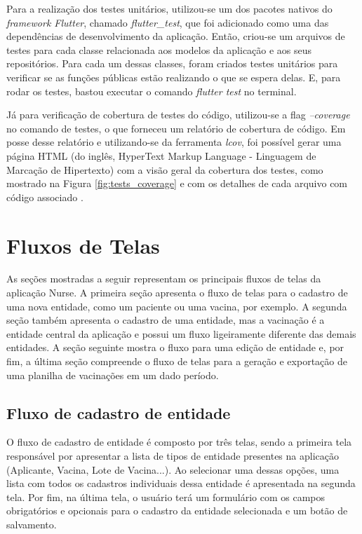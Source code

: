 Para a realização dos testes unitários, utilizou-se um dos pacotes nativos do \textit{framework Flutter}, chamado \textit{flutter\_test}, que foi adicionado como uma das dependências de desenvolvimento da aplicação. Então, criou-se um arquivos de testes para cada classe relacionada aos modelos da aplicação e aos seus repositórios. Para cada um dessas classes, foram criados testes unitários para verificar se as funções públicas estão realizando o que se espera delas. E, para rodar os testes, bastou executar o comando \textit{flutter test} no terminal.

Já para verificação de cobertura de testes do código, utilizou-se a flag \textit{--coverage} no comando de testes, o que forneceu um relatório de cobertura de código. Em posse desse relatório e utilizando-se da ferramenta \textit{lcov}, foi possível gerar uma página HTML (do inglês, HyperText Markup Language - Linguagem de Marcação de Hipertexto) com a visão geral da cobertura dos testes, como mostrado na Figura \ref{fig:tests_coverage} e com os detalhes de cada arquivo com código associado \cite{lcov}.


\section{Fluxos de Telas}
\label{cap5:Sec:FluxosTelas}
As seções mostradas a seguir representam os principais fluxos de telas da aplicação Nurse. A primeira seção apresenta o fluxo de telas para o cadastro de uma nova entidade, como um paciente ou uma vacina, por exemplo. A segunda seção também apresenta o cadastro de uma entidade, mas a vacinação é a entidade central da aplicação e possui um fluxo ligeiramente diferente das demais entidades. A seção seguinte mostra o fluxo para uma edição de entidade e, por fim, a última seção compreende o fluxo de telas para a geração e exportação de uma planilha de vacinações em um dado período. 

\subsection{Fluxo de cadastro de entidade}
\label{cap5:SubSec:FluxoCadastroEntidade}
O fluxo de cadastro de entidade é composto por três telas, sendo a primeira tela responsável por apresentar a lista de tipos de entidade presentes na aplicação (Aplicante, Vacina, Lote de Vacina...). Ao selecionar uma dessas opções, uma lista com todos os cadastros individuais dessa entidade é apresentada na segunda tela. Por fim, na última tela, o usuário terá um formulário com os campos obrigatórios e opcionais para o cadastro da entidade selecionada e um botão de salvamento.

